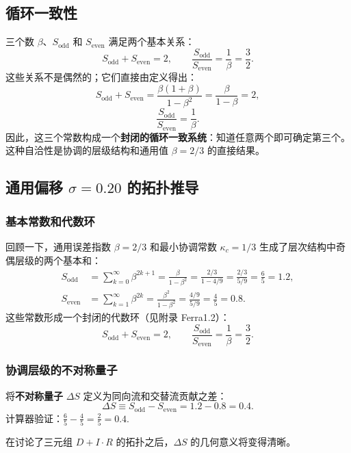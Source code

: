 \documentclass[12pt,a4paper]{article}
\begin{document}
	\subsection{循环一致性}
	三个数 \(\beta\)、\(S_{\text{odd}}\) 和 \(S_{\text{even}}\) 满足两个基本关系：
	\[
	S_{\text{odd}} + S_{\text{even}} = 2,\qquad
	\frac{S_{\text{odd}}}{S_{\text{even}}} = \frac{1}{\beta} = \frac{3}{2}.
	\]
	这些关系不是偶然的；它们直接由定义得出：
	\[
	S_{\text{odd}} + S_{\text{even}} = \frac{\beta(1+\beta)}{1-\beta^2} = \frac{\beta}{1-\beta}=2,
	\]
	\[
	\frac{S_{\text{odd}}}{S_{\text{even}}} = \frac{1}{\beta}.
	\]
	因此，这三个常数构成一个\textbf{封闭的循环一致系统}：知道任意两个即可确定第三个。这种自洽性是协调的层级结构和通用值 \(\beta=2/3\) 的直接结果。
	
	\subsection{通用偏移 \(\sigma = 0.20\) 的拓扑推导}
	\label{sec:sigma_topology}
	
	\subsubsection{基本常数和代数环}
	
	回顾一下，通用误差指数 \(\beta = 2/3\) 和最小协调常数 \(\kappa_c = 1/3\) 生成了层次结构中奇偶层级的两个基本和：
	\begin{align}
		S_{\mathrm{odd}} &= \sum_{k=0}^{\infty} \beta^{2k+1} = \frac{\beta}{1-\beta^2} = \frac{2/3}{1-4/9} = \frac{2/3}{5/9} = \frac{6}{5} = 1.2, \label{eq:Sodd_again}\\
		S_{\mathrm{even}} &= \sum_{k=1}^{\infty} \beta^{2k} = \frac{\beta^2}{1-\beta^2} = \frac{4/9}{5/9} = \frac{4}{5} = 0.8. \label{eq:Seven_again}
	\end{align}
	这些常数形成一个封闭的代数环（见附录 Ferra1.2）：
	\[
	S_{\mathrm{odd}} + S_{\mathrm{even}} = 2, \qquad \frac{S_{\mathrm{odd}}}{S_{\mathrm{even}}} = \frac{1}{\beta} = \frac{3}{2}.
	\]
	
	\subsubsection{协调层级的不对称量子}
	
	将\textbf{不对称量子} \(\Delta S\) 定义为同向流和交替流贡献之差：
	\[
	\Delta S \equiv S_{\mathrm{odd}} - S_{\mathrm{even}} = 1.2 - 0.8 = 0.4.
	\]
	计算器验证：\(\frac{6}{5} - \frac{4}{5} = \frac{2}{5} = 0.4.\)
	
	在讨论了三元组 \(D+I\cdot R\) 的拓扑之后，\(\Delta S\) 的几何意义将变得清晰。
	
\end{document}
